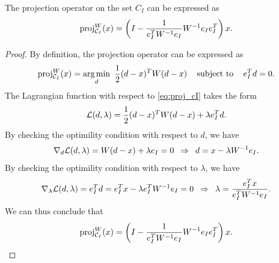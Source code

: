 \begin{lemma} \label{lemma:projection1}
    The projection operator on the set $C_I$ can be expressed as 
    \[\operatorname{proj}_{\mathcal{C}_I}^{W}(x) = \left(I - \frac{1}{e_I^T W^{-1} e_I}W^{-1}e_I e_I^T\right)x.\]
\end{lemma}
\begin{proof}
    By definition, the projection operator can be expressed as 
\begin{equation} \label{eq:proj_cI}
    \operatorname{proj}_{\mathcal{C}_I}^{W}(x) = \underset{d}{\textrm{arg}\,{\min}}\enskip \frac{1}{2} (d - x)^TW(d-x) \enspace\enspace\mathop{\hbox{\rm subject to}}\enspace\enspace e_I^Td = 0.
\end{equation}
The Lagrangian function with respect to \autoref{eq:proj_cI} takes the form 
\[\mathcal{L}(d, \lambda) = \frac{1}{2} (d - x)^TW(d-x) + \lambda e_I^Td.\]
By checking the optimility condition with respect to $d$, we have
\[\nabla_d \mathcal{L}(d, \lambda) = W(d - x) + \lambda e_I = 0 \enspace\Rightarrow\enspace d = x - \lambda W^{-1} e_I.\]
By checking the optimility condition with respect to $\lambda$, we have 
\[
    \nabla_\lambda \mathcal{L}(d, \lambda) = e_I^Td
    = e_I^Tx - \lambda e_I^T W^{-1} e_I = 0 
    \enspace\Rightarrow\enspace
    \lambda = \frac{e_I^T x}{e_I^T W^{-1} e_I}.
\]
We can thus conclude that 
\[\operatorname{proj}_{\mathcal{C}_I}^{W}(x) = \left(I - \frac{1}{e_I^T W^{-1} e_I}W^{-1}e_I e_I^T\right)x.\]
\end{proof}


